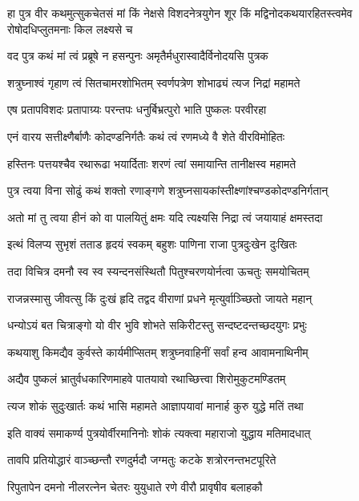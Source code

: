 \fourlineindentedshloka
{हा पुत्र वीर कथमुत्सुकचेतसं मां}
{किं नेक्षसे विशदनेत्रयुगेन शूर}
{किं मद्विनोदकथयारहितस्त्वमेव}
{रोषोदधिप्लुतमनाः किल लक्ष्यसे च}%

\twolineshloka
{वद पुत्र कथं मां त्वं प्रब्रूषे न हसन्पुनः}
{अमृतैर्मधुरास्वादैर्विनोदयसि पुत्रक}%

\twolineshloka
{शत्रुघ्नाश्वं गृहाण त्वं सितचामरशोभितम्}
{स्वर्णपत्रेण शोभाढ्यं त्यज निद्रां महामते}%

\twolineshloka
{एष प्रतापविशदः प्रतापाग्र्यः परन्तपः}
{धनुर्बिभ्रत्पुरो भाति पुष्कलः परवीरहा}%

\twolineshloka
{एनं वारय सत्तीक्ष्णैर्बाणैः कोदण्डनिर्गतैः}
{कथं त्वं रणमध्ये वै शेते वीरविमोहितः}%

\twolineshloka
{हस्तिनः पत्तयश्चैव रथारूढा भयार्दिताः}
{शरणं त्वां समायान्ति तानीक्षस्व महामते}%

\twolineshloka
{पुत्र त्वया विना सोढुं कथं शक्तो रणाङ्गणे}
{शत्रुघ्नसायकांस्तीक्ष्णांश्चण्डकोदण्डनिर्गतान्}%

\twolineshloka
{अतो मां तु त्वया हीनं को वा पालयितुं क्षमः}
{यदि त्यक्ष्यसि निद्रा त्वं जयायाहं क्षमस्तदा}%

\twolineshloka
{इत्थं विलप्य सुभृशं तताड हृदयं स्वकम्}
{बहुशः पाणिना राजा पुत्रदुःखेन दुःखितः}%

\twolineshloka
{तदा विचित्र दमनौ स्व स्व स्यन्दनसंस्थितौ}
{पितुश्चरणयोर्नत्वा ऊचतुः समयोचितम्}%

\twolineshloka
{राजन्नस्मासु जीवत्सु किं दुःखं हृदि तद्वद}
{वीराणां प्रधने मृत्युर्वाञ्च्छितो जायते महान्}%

\twolineshloka
{धन्योऽयं बत चित्राङ्गो यो वीर भुवि शोभते}
{सकिरीटस्तु सन्दष्टदन्तच्छदयुगः प्रभुः}%

\twolineshloka
{कथयाशु किमद्यैव कुर्वस्ते कार्यमीप्सितम्}
{शत्रुघ्नवाहिनीं सर्वां हन्व आवामनाथिनीम्}%

\twolineshloka
{अद्यैव पुष्कलं भ्रातुर्वधकारिणमाहवे}
{पातयावो रथाच्छित्त्वा शिरोमुकुटमण्डितम्}%

\twolineshloka
{त्यज शोकं सुदुःखार्तः कथं भासि महामते}
{आज्ञापयावां मानार्ह कुरु युद्धे मतिं तथा}%

\twolineshloka
{इति वाक्यं समाकर्ण्य पुत्रयोर्वीरमानिनोः}
{शोकं त्यक्त्वा महाराजो युद्धाय मतिमादधात्}%

\twolineshloka
{तावपि प्रतियोद्धारं वाञ्च्छन्तौ रणदुर्मदौ}
{जग्मतुः कटके शत्रोरनन्तभटपूरिते}%

\twolineshloka
{रिपुतापेन दमनो नीलरत्नेन चेतरः}
{युयुधाते रणे वीरौ प्रावृषीव बलाहकौ}%

